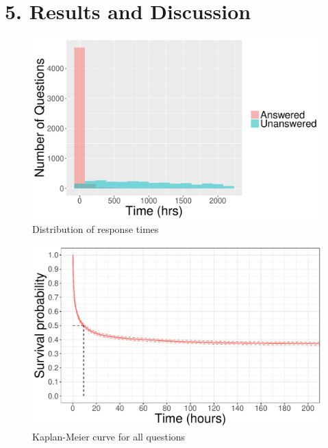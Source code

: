 \documentclass{article}
\begin{document}

\section*{5. Results and Discussion}


\begin{figure}[!htbp]
  \includegraphics[scale=1]{times_dist.pdf}
  \caption{Distribution of response times}
  \label{fig:answertimes}
\end{figure}

\begin{figure}[!htbp]
  \includegraphics[scale=1]{kmcurve.pdf}
  \caption{Kaplan-Meier curve for all questions}
  \label{fig:kmcurve}
\end{figure}
\end{document}
